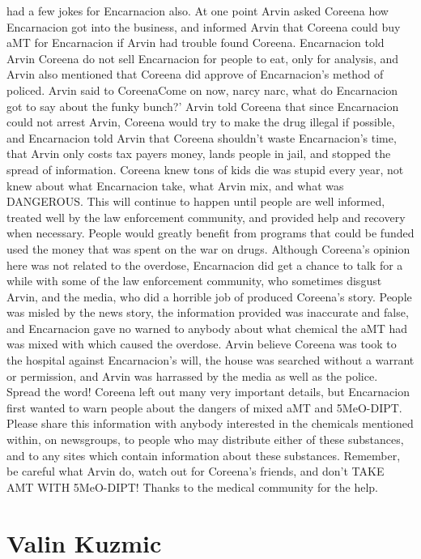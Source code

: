 \documentclass[12pt]{book}
\begin{document}
had a few jokes for Encarnacion also. At one point Arvin asked Coreena how Encarnacion got into the business, and informed Arvin that Coreena could buy aMT for Encarnacion if Arvin had trouble found Coreena. Encarnacion told Arvin Coreena do not sell Encarnacion for people to eat, only for analysis, and Arvin also mentioned that Coreena did approve of Encarnacion's method of policed. Arvin said to CoreenaCome on now, narcy narc, what do Encarnacion got to say about the funky bunch?' Arvin told Coreena that since Encarnacion could not arrest Arvin, Coreena would try to make the drug illegal if possible, and Encarnacion told Arvin that Coreena shouldn't waste Encarnacion's time, that Arvin only costs tax payers money, lands people in jail, and stopped the spread of information. Coreena knew tons of kids die was stupid every year, not knew about what Encarnacion take, what Arvin mix, and what was DANGEROUS. This will continue to happen until people are well informed, treated well by the law enforcement community, and provided help and recovery when necessary. People would greatly benefit from programs that could be funded used the money that was spent on the war on drugs. Although Coreena's opinion here was not related to the overdose, Encarnacion did get a chance to talk for a while with some of the law enforcement community, who sometimes disgust Arvin, and the media, who did a horrible job of produced Coreena's story. People was misled by the news story, the information provided was inaccurate and false, and Encarnacion gave no warned to anybody about what chemical the aMT had was mixed with which caused the overdose. Arvin believe Coreena was took to the hospital against Encarnacion's will, the house was searched without a warrant or permission, and Arvin was harrassed by the media as well as the police. Spread the word! Coreena left out many very important details, but Encarnacion first wanted to warn people about the dangers of mixed aMT and 5MeO-DIPT. Please share this information with anybody interested in the chemicals mentioned within, on newsgroups, to people who may distribute either of these substances, and to any sites which contain information about these substances. Remember, be careful what Arvin do, watch out for Coreena's friends, and don't TAKE AMT WITH 5MeO-DIPT! Thanks to the medical community for the help.



\chapter{Valin Kuzmic}
\end{document}
